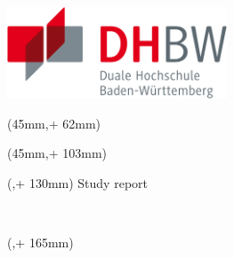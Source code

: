
\newlength{\bindekorrektur}
\newlength{\seitenanfang}
\newlength{\seitenbreite}
  
\setlength{\bindekorrektur}{-46mm}   %
\setlength{\seitenanfang}{0mm}       %
\setlength{\seitenbreite}{297mm}

\noindent\includegraphics[width=0.49\textwidth]{img/DHBW-Logo.pdf}
\hfill

\begin{textblock*}{128mm}(45mm,\seitenanfang + 62mm) %
  \centering\Large\sffamily
  \vspace{4mm} %
  \textbf{\dhbwtitel}
\end{textblock*}%

\begin{textblock*}{128mm}(45mm,\seitenanfang + 103mm)
  \centering\large\sffamily
  \dhbwautor
\end{textblock*}

\begin{textblock*}{\seitenbreite}(\bindekorrektur,\seitenanfang + 130mm)
  \centering\large\sffamily
  Study report \\ %
  \begin{small}\dhbwthesistype \end{small}\\
  \vspace{2mm}
  \dhbwstudiengangname
\end{textblock*}

\begin{textblock*}{\seitenbreite}(\bindekorrektur,\seitenanfang + 165mm)
  \centering\large\sffamily
  \dhbwfakultaetlang\\
  \vspace{2mm}
  \dhbwkoerperschaft
\end{textblock*}

